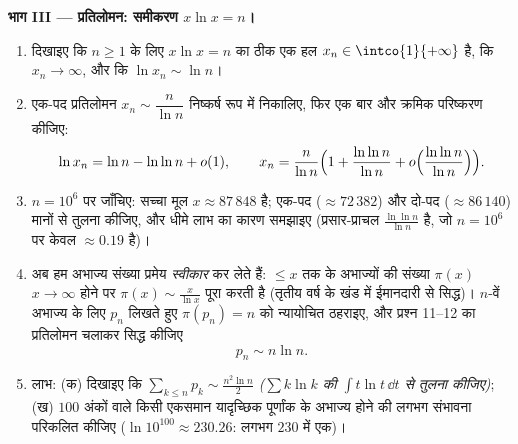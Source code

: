 \begin{problem}
\medskip
\noindent\textbf{भाग III --- प्रतिलोमन: समीकरण $x\ln x =
n$।}
\begin{enumerate}[resume]
  \item दिखाइए कि $n \geq 1$ के लिए $x\ln x = n$ का ठीक एक हल $x_n \in
        \intco{1}{+\infty}$ है, कि $x_n \to
        \infty$, और कि
        $\ln x_n \sim \ln n$।
  \item एक-पद प्रतिलोमन $x_n \sim
        \dfrac{n}{\ln n}$ निष्कर्ष रूप में निकालिए, फिर एक बार और
        क्रमिक परिष्करण कीजिए:
        \[
        \ln x_n = \ln n - \ln\ln n + o(1),
        \qquad
        x_n = \frac{n}{\ln n}\Bigl(1 + \frac{\ln\ln n}{\ln n}
        + o\Bigl(\frac{\ln\ln n}{\ln n}\Bigr)\Bigr).
        \]
  \item $n = 10^6$ पर जाँचिए: सच्चा मूल $x \approx
        87\,848$ है; एक-पद ($\approx 72\,382$) और दो-पद ($\approx 86\,140$)
        मानों से तुलना कीजिए, और धीमे लाभ का कारण समझाइए (प्रसार-प्राचल
        $\frac{\ln\ln
        n}{\ln n}$ है, जो $n = 10^6$ पर केवल $\approx 0.19$ है)।
  \item अब हम अभाज्य संख्या प्रमेय \emph{स्वीकार} कर लेते हैं: $\leq x$ तक
        के अभाज्यों की संख्या $\pi(x)$ $x \to \infty$ होने पर $\pi(x) \sim
        \frac{x}{\ln x}$ पूरा करती है
        (तृतीय वर्ष के खंड में ईमानदारी से सिद्ध)। $n$-वें अभाज्य के
        लिए $p_n$ लिखते हुए $\pi(p_n) = n$ को न्यायोचित ठहराइए, और प्रश्न 11--12
        का प्रतिलोमन चलाकर सिद्ध कीजिए
        \[
        p_n \sim n \ln n .
        \]
  \item लाभ: (क) दिखाइए कि $\sum_{k \leq n} p_k \sim
        \frac{n^2\ln n}{2}$ \emph{($\sum k\ln k$ की $\int t\ln t\,\dd t$ से तुलना कीजिए)};
        (ख) $100$ अंकों वाले किसी एकसमान यादृच्छिक पूर्णांक के अभाज्य
        होने की लगभग संभावना परिकलित कीजिए ($\ln 10^{100} \approx 230.26$: लगभग $230$ में एक)।
\end{enumerate}


\end{problem}
